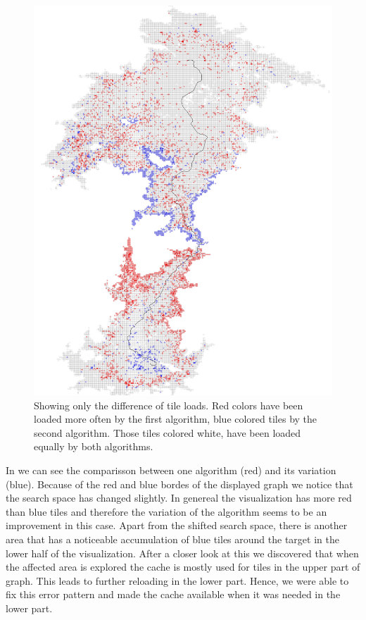 \documentclass
[
    paper = a4,
    pagesize,
    12 pt,
    oneside,                       %
    open = right,
    DIV = calc,
    BCOR = 0 mm,                   %
    bibtotoc
]
{scrbook}
\begin{document}
\begin{figure}
    \includegraphics[width=\textwidth]{Images/vis-compare-colored.png}
\caption[]{Showing only the difference of tile loads. Red colors have been loaded more often by the first algorithm, blue colored tiles by the second algorithm. Those tiles colored white, have been loaded equally by both algorithms.}
\label{fig:difference}
\end{figure}

In   we can see the comparisson between one algorithm (red) and its variation (blue).
Because of the red and blue bordes of the displayed graph we notice that the search space has changed slightly.
In genereal the visualization has more red than blue tiles and therefore the variation of the algorithm seems to be an improvement in this case.
Apart from the shifted search space, there is another area that has a noticeable accumulation of blue tiles around the target in the lower half of the visualization.
After a closer look at this we discovered that when the affected area is explored the cache is mostly used for tiles in the upper part of graph.
This leads to further reloading in the lower part.
Hence, we were able to fix this error pattern and made the cache available when it was needed in the lower part.
\end{document}
